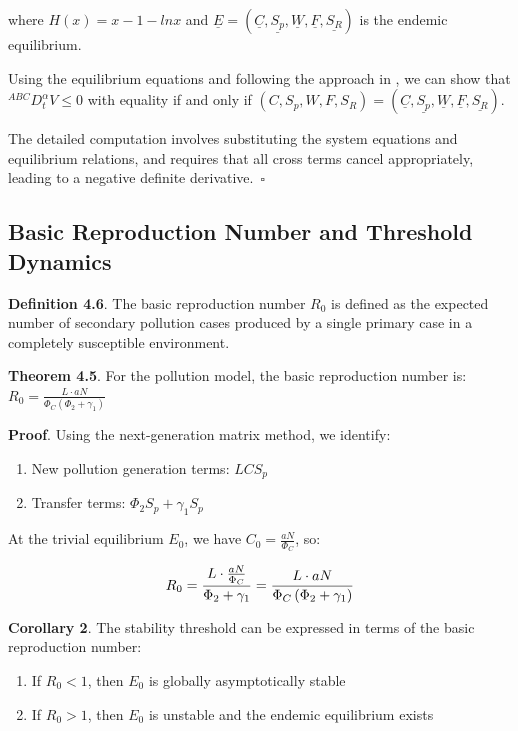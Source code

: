 \documentclass[10pt]{NSP1}
\newcommand{\fitwidth}[1]{\resizebox{\ifdim\width>\linewidth\linewidth\else\width\fi}{!}{#1}}
\begin{document}
where \(H(x) = x - 1 - lnx\) and \(\underline{E} = \left( \underline{C},\underline{S_{p}},\underline{W},\underline{F},\underline{S_{R}} \right)\) is the endemic equilibrium.

Using the equilibrium equations and following the approach in , we can show that \(^{ABC}D_{t}^{\alpha}V \leq 0\) with equality if and only if \(\left( C,S_{p},W,F,S_{R} \right) = \left( \underline{C},\underline{S_{p}},\underline{W},\underline{F},\underline{S_{R}} \right)\).

The detailed computation involves substituting the system equations and equilibrium relations, and requires that all cross terms cancel appropriately, leading to a negative definite derivative.~$\square$

\subsection{Basic Reproduction Number and Threshold Dynamics}

\textbf{Definition 4.6}.\cite{ref5} The basic reproduction number \(R_{0}\) is defined as the expected number of secondary pollution cases produced by a single primary case in a completely susceptible environment.

\textbf{Theorem 4.5}. For the pollution model, the basic reproduction number is: \(R_{0} = \frac{L \cdot aN}{\Phi_{C}\left( \Phi_{2} + \gamma_{1} \right)}\)

\textbf{Proof}. Using the next-generation matrix method, we identify:

\begin{enumerate}
\def\labelenumi{\arabic{enumi}.}
\item
  New pollution generation terms: \(LCS_{p}\)
\item
  Transfer terms: \(\Phi_{2}S_{p} + \gamma_{1}S_{p}\)
\end{enumerate}

At the trivial equilibrium \(E_{0}\), we have \(C_{0} = \frac{aN}{\Phi_{C}}\), so:

\[
\fitwidth{$\displaystyle R_{0} = \frac{L \cdot \frac{aN}{\Phi_{C}}}{\Phi_{2} + \gamma_{1}} = \frac{L \cdot aN}{\Phi_{C}\left( \Phi_{2} + \gamma_{1} \right)}$}
\]

\textbf{Corollary 2}. The stability threshold can be expressed in terms of the basic reproduction number:

\begin{enumerate}
\def\labelenumi{\arabic{enumi}.}
\item
  If \(R_{0} < 1\), then \(E_{0}\) is globally asymptotically stable
\item
  If \(R_{0} > 1\), then \(E_{0}\) is unstable and the endemic equilibrium exists
\end{enumerate}
\end{document}
